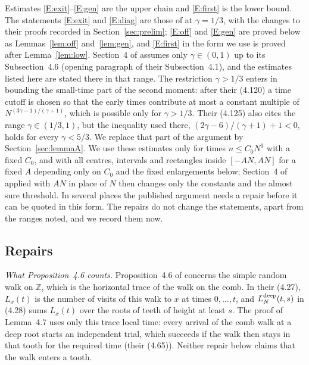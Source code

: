 \documentclass[11pt]{amsart}
\theoremstyle{remark}
\numberwithin{equation}{section}
\newcommand{\Z}{\mathbb{Z}}
\begin{document}
Estimates \ref{E:exit}--\ref{E:gen} are the upper chain and \ref{E:first} is the lower bound. The statements \ref{E:exit} and \ref{E:diag} are those of \cite{DNNS} at $\gamma=1/3$, with the changes to their proofs recorded in Section~\ref{sec:prelim}; \ref{E:off} and \ref{E:gen} are proved below as Lemmas~\ref{lem:off} and~\ref{lem:gen}, and \ref{E:first} in the form we use is proved after Lemma~\ref{lem:low}. Section~4 of \cite{DNNS} assumes only $\gamma\in(0,1)$ up to its Subsection~4.6 (opening paragraph of their Subsection~4.1), and the estimates listed here are stated there in that range. The restriction $\gamma>1/3$ enters in bounding the small-time part of the second moment: after their (4.120) a time cutoff is chosen so that the early times contribute at most a constant multiple of $N^{(3\gamma-1)/(\gamma+1)}$, which is possible only for $\gamma>1/3$. Their (4.125) also cites the range $\gamma\in(1/3,1)$, but the inequality used there, $(2\gamma-6)/(\gamma+1)+1<0$, holds for every $\gamma<5/3$. We replace that part of the argument by Section~\ref{sec:lemmaA}. We use these estimates only for times $n\le C_0N^3$ with a fixed $C_0$, and with all centres, intervals and rectangles inside $[-AN,AN]$ for a fixed $A$ depending only on $C_0$ and the fixed enlargements below; Section~4 of \cite{DNNS} applied with $AN$ in place of $N$ then changes only the constants and the almost sure threshold. In several places the published argument needs a repair before it can be quoted in this form. The repairs do not change the statements, apart from the ranges noted, and we record them now.

\subsection{Repairs}
\emph{What Proposition~4.6 counts.} Proposition~4.6 of \cite{DNNS} concerns the simple random walk on $\Z$, which is the horizontal trace of the walk on the comb. In their (4.27), $L_x(t)$ is the number of visits of this walk to $x$ at times $0,\dots,t$, and $L^{\rm deep}_N(t,s)$ in (4.28) sums $L_x(t)$ over the roots of teeth of height at least $s$. The proof of Lemma~4.7 uses only this trace local time: every arrival of the comb walk at a deep root starts an independent trial, which succeeds if the walk then stays in that tooth for the required time (their (4.65)). Neither repair below claims that the walk enters a tooth.
\end{document}

